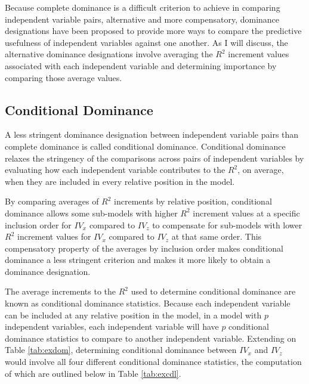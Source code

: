 \documentclass[man]{apa7}
\begin{document}
	Because complete dominance is a difficult criterion to achieve in comparing independent variable pairs, alternative and more compensatory, dominance designations have been proposed to provide more ways to compare the predictive usefulness of independent variables against one another.
	As I will discuss, the alternative dominance designations involve averaging the $R^2$ increment values associated with each independent variable and determining importance by comparing those average values.
	
	\subsection{Conditional Dominance}
	
	A less stringent dominance designation between independent variable pairs than complete dominance is called conditional dominance.
	Conditional dominance relaxes the stringency of the comparisons across pairs of independent variables by evaluating how each independent variable contributes to the $R^2$, on average, when they are included in every relative position in the model.
	
	By comparing averages of $R^2$ increments by relative position, conditional dominance allows some sub-models with higher $R^2$ increment values at a specific inclusion order for $IV_x$ compared to $IV_z$ to compensate for sub-models with lower $R^2$ increment values for $IV_x$ compared to $IV_z$ at that same order.
	This compensatory property of the averages by inclusion order makes conditional dominance a less stringent criterion and makes it more likely to obtain a dominance designation.
	
	The average increments to the $R^2$ used to determine conditional dominance are known as conditional dominance statistics.
	Because each independent variable can be included at any relative position in the model, in a model with $p$ independent variables, each independent variable will have $p$ conditional dominance statistics to compare to another independent variable.
	Extending on Table \ref{tab:exdom}, determining conditional dominance between $IV_x$ and $IV_z$ would involve all four different conditional dominance statistics, the computation of which are outlined below in Table \ref{tab:excdl}.
	
\end{document}
